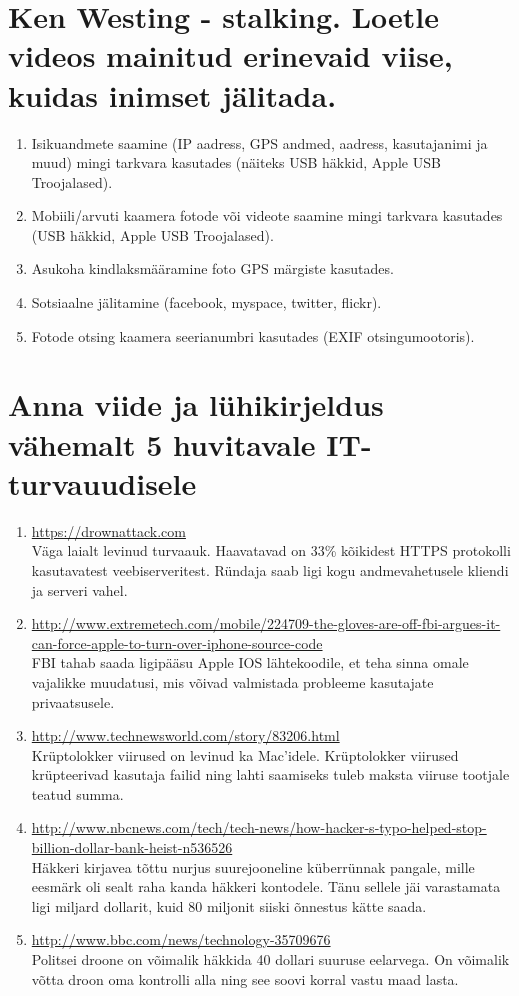 \documentclass{article}
\begin{document}
\section{Ken Westing - stalking. Loetle videos mainitud erinevaid viise, kuidas inimset jälitada.}
\begin{enumerate}
	\item{Isikuandmete saamine (IP aadress,  GPS andmed, aadress, kasutajanimi ja muud) mingi tarkvara kasutades (näiteks USB häkkid, Apple USB Troojalased).}
	\item{Mobiili/arvuti kaamera fotode või videote saamine mingi tarkvara kasutades (USB häkkid, Apple USB Troojalased).}
	\item{Asukoha kindlaksmääramine foto GPS märgiste kasutades.}
	\item{Sotsiaalne jälitamine (facebook, myspace, twitter, flickr).}
	\item{Fotode otsing kaamera seerianumbri kasutades (EXIF otsingumootoris).}
\end{enumerate}

\section{Anna viide ja lühikirjeldus vähemalt 5 huvitavale IT-turvauudisele}
\begin{enumerate}
	\item{\url{https://drownattack.com}\\
		Väga laialt levinud turvaauk. Haavatavad on 33\% kõikidest HTTPS protokolli kasutavatest veebiserveritest. 
		Ründaja saab ligi kogu andmevahetusele kliendi ja serveri vahel.}
	\item{\url{http://www.extremetech.com/mobile/224709-the-gloves-are-off-fbi-argues-it-can-force-apple-to-turn-over-iphone-source-code}\\
		FBI tahab saada ligipääsu Apple IOS lähtekoodile, et teha sinna omale vajalikke muudatusi, mis võivad valmistada probleeme kasutajate privaatsusele.}
	\item{\url{http://www.technewsworld.com/story/83206.html}\\
		Krüptolokker viirused on levinud ka Mac'idele. Krüptolokker viirused krüpteerivad kasutaja failid ning lahti saamiseks tuleb maksta viiruse tootjale teatud summa.}
	\item{\url{http://www.nbcnews.com/tech/tech-news/how-hacker-s-typo-helped-stop-billion-dollar-bank-heist-n536526}\\
		Häkkeri kirjavea tõttu nurjus suurejooneline küberrünnak pangale, mille eesmärk oli sealt raha kanda häkkeri kontodele. Tänu sellele jäi varastamata ligi miljard dollarit, kuid 80 miljonit siiski õnnestus kätte saada.}
	\item{\url{http://www.bbc.com/news/technology-35709676}\\
		Politsei droone on võimalik häkkida 40 dollari suuruse eelarvega. On võimalik võtta droon oma kontrolli alla ning see soovi korral vastu maad lasta.}
\end{enumerate}
\end{document}
